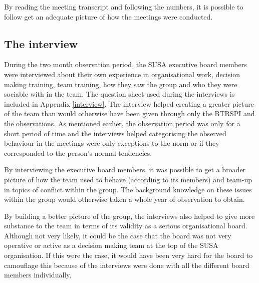\documentclass[a4paper,12pt,titlepage]{report}
\begin{document}
  By reading the meeting transcript and following the numbers, it is possible
  to follow get an adequate picture of how the meetings were conducted.

  \subsection{The interview}

  During the two month observation period, the SUSA executive board members were
  interviewed about their own experience in organisational work,
  decision making training, team training, how
  they saw the group and who they were sociable with in the team. The
  question sheet used during the interviews is included in Appendix \ref{interview}.
  The interview helped creating a greater picture of the team than would
  otherwise have been given through only the BTRSPI and the observations.
  As mentioned earlier, the observation period was only for a short period of
  time and the interviews helped categorising the observed behaviour
  in the meetings were only exceptions to the norm or if they corresponded
  to the person's normal tendencies.

  By interviewing the executive board members,
  it was possible to get a broader picture of how the
  team used to behave (according to its members) and team-up in topics
  of conflict within the group. The background knowledge on these issues
  within the group would otherwise taken a whole year of observation to obtain.

  By building a better picture of the group, the interviews also helped
  to give more substance to the team in terms of its validity as a
  serious organisational board. Although not very likely, it could be
  the case that the board was not very operative or active as a decision
  making team at the top of the SUSA organisation. If this were the case, it
  would have been very hard for the board to camouflage this
  because of the interviews were done with all the different board members
  individually.
\end{document}
